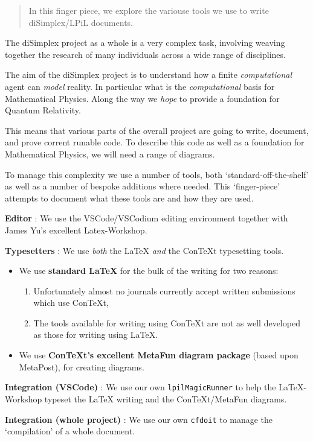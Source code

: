 
\author{Stephen Gaito}

\begin{abstract}
  In this finger piece, we explore the variouse tools we use to write
  diSimplex/LPiL documents.
\end{abstract}

\maketitle

The diSimplex project as a whole is a very complex task, involving weaving
together the research of many individuals across a wide range of disciplines.

The aim of the diSimplex project is to understand how a finite
\emph{computational} agent can \emph{model} reality. In particular what is the
\emph{computational} basis for Mathematical Physics. Along the way we
\emph{hope} to provide a foundation for Quantum Relativity.

This means that various parts of the overall project are going to write,
document, and prove corrent runable code. To describe this code as well as a
foundation for Mathematical Physics, we will need a range of diagrams.

To manage this complexity we use a number of tools, both
`standard-off-the-shelf' as well as a number of bespoke additions where needed.
This `finger-piece' attempts to document what these tools are and how they are
used.

\textbf{Editor} : We use the VSCode/VSCodium editing environment
together with James Yu's excellent Latex-Workshop.

\textbf{Typesetters} : We use \emph{both} the LaTeX \emph{and} the
ConTeXt typesetting tools.
\begin{itemize}
  \item We use \textbf{standard LaTeX} for the bulk of the writing for two
  reasons:
  \begin{enumerate}
    \item Unfortunately almost no journals currently accept written
    submissions which use ConTeXt,
    \item The tools available for writing using ConTeXt are not as well
    developed as those for writing using LaTeX.
  \end{enumerate}
  \item We use \textbf{ConTeXt's excellent MetaFun diagram package} (based
  upon MetaPost), for creating diagrams.
\end{itemize}

\textbf{Integration (VSCode)} : We use our own \verb|lpilMagicRunner| to help
the LaTeX-Workshop typeset the LaTeX writing and the ConTeXt/MetaFun diagrams.

\textbf{Integration (whole project)} : We use our own \verb|cfdoit| to manage
the `compilation' of a whole document.





